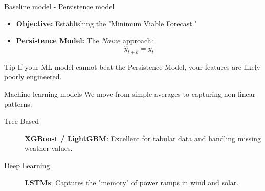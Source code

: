 \begin{frame}{Baseline model - Persistence model}
    \begin{itemize}
        \item \textbf{Objective:} Establishing the "Minimum Viable Forecast."
        \item \textbf{Persistence Model:} The $Naive$ approach:
        \[ \hat{y}_{t+k} = y_t \]
    \end{itemize}
    \begin{exampleblock}{Tip}
        If your ML model cannot beat the Persistence Model, your features are likely poorly engineered.
    \end{exampleblock}
\end{frame}
\begin{frame}{Machine learning models}
    We move from simple averages to capturing non-linear patterns:
    \vspace{0.3cm}
    \begin{description}
        \item[Tree-Based] \textbf{XGBoost / LightGBM}: Excellent for tabular data and handling missing weather values.
        \item[Deep Learning] \textbf{LSTMs}: Captures the "memory" of power ramps in wind and solar.
    \end{description}
\end{frame}

